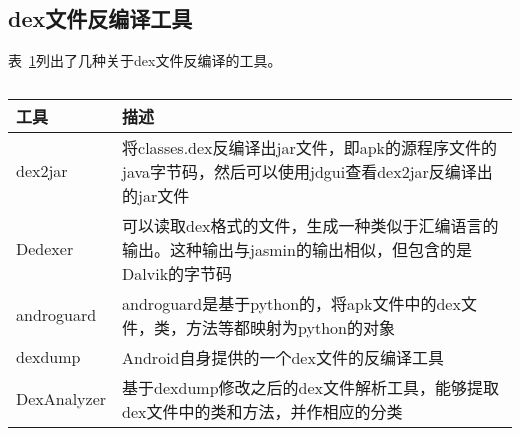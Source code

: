 \subsection{dex文件反编译工具}
\label{dextools}
表~\ref{fig:dextools}列出了几种关于dex文件反编译的工具。
\begin{table}[H]
\caption{\label{fig:dextools}}
\begin{tabular}{|p{2cm}|p{9.5cm}|}
\hline
工具 & 描述\\
\hline
dex2jar & 将classes.dex反编译出jar文件，即apk的源程序文件的java字节码，然后可以使用jdgui查看dex2jar反编译出的jar文件\\
\hline
Dedexer & 可以读取dex格式的文件，生成一种类似于汇编语言的输出。这种输出与jasmin的输出相似，但包含的是Dalvik的字节码\\
\hline
androguard & androguard是基于python的，将apk文件中的dex文件，类，方法等都映射为python的对象\\\hline
dexdump & Android自身提供的一个dex文件的反编译工具\\
\hline
DexAnalyzer & 基于dexdump修改之后的dex文件解析工具，能够提取dex文件中的类和方法，并作相应的分类\\
\hline
\end{tabular}
\end{table}

